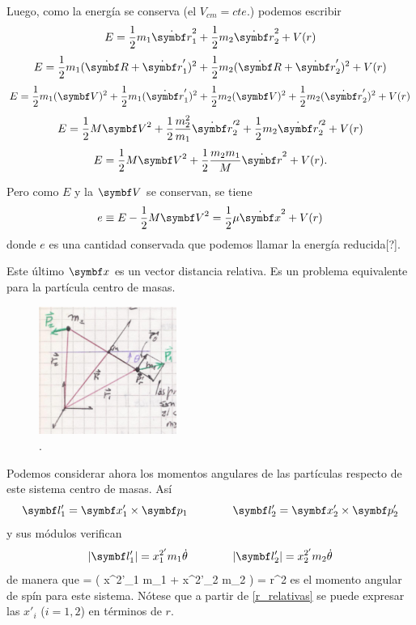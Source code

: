 \documentclass[10pt,oneside]{CBFT_book}
\begin{document}
Luego, como la energía se conserva (el $V_{cm}=cte.$) podemos escribir
\[
	E = \frac{1}{2} m_1 \dot{\vb{r}}_1^2 + \frac{1}{2} m_2 \dot{\vb{r}}_2^2 + V(r)
\]
\[
	E = \frac{1}{2} m_1 ( \dot{\vb{R}} + \dot{\vb{r}}_1' )^2 + \frac{1}{2} m_2 ( \dot{\vb{R}} + \dot{\vb{r}}_2' )^2 
+ V(r)
\]
\[
	E = \frac{1}{2} m_1 ( {\vb{V}} )^2 +  \frac{1}{2} m_1 ( \dot{\vb{r}}_1' )^2 + 
		\frac{1}{2} m_2 ( {\vb{V}})^2 + \frac{1}{2} m_2 (\dot{\vb{r}}_2' )^2 + V(r)
\]
\[
	E = \frac{1}{2} M {\vb{V}}^2 + \frac{1}{2} \frac{m_2^2}{m_1} \dot{\vb{r}}_2'^2 + \frac{1}{2} m_2 
\dot{\vb{r}}_2'^2 + V(r)
\]
\[
	E = \frac{1}{2} M {\vb{V}}^2 + \frac{1}{2} \frac{m_2 m_1}{M} \dot{\vb{r}}^2 + V(r).
\]

Pero como $E$ y la $\vb{V}$ se conservan, se tiene 
\[
	e \equiv E - \frac{1}{2} M {\vb{V}}^2 =  \frac{1}{2} \mu \dot{\vb{x}}^2 + V(r)
\]
donde $e$ es una cantidad conservada que podemos llamar la energía reducida[?].

Este último $\vb{x}$ es un vector distancia relativa. Es un problema equivalente para la partícula
centro de masas.

\begin{figure}[hbt]
	\begin{center}
	\includegraphics[width=0.4\textwidth]{images/fig_mc_prob_equiv.pdf}	 
	\end{center}
	\caption{.}
	\label{fig_mc_prob_equiv}
\end{figure} 

Podemos considerar ahora los momentos angulares de las partículas respecto de este sistema centro
de masas. Así
\[
	\vb{l}_1' = \vb{x}_1' \times \vb{p}_1 \qquad \qquad  \vb{l}_2' = \vb{x}_2' \times \vb{p}_2'
\]
y sus módulos verifican 
\[
	|\vb{l}_1'| = {x}^{2'}_1 m_1 \dot{\theta} \qquad \qquad  |\vb{l}_2'| = {x}^{2'}_2 m_2 \dot{\theta}
\]
de manera que 
\be
	\ell = ( {x}^{2'}_1 m_1 + {x}^{2'}_2 m_2 ) \dot{\theta} = \mu r^2 \dot{\theta}
	\label{mom_ang_conserv}
\ee
es el momento angular de spín para este sistema. Nótese que a partir de \eqref{r_relativas} se puede
expresar las $x'_i$ ($i=1,2$) en términos de $r$.
\end{document}
